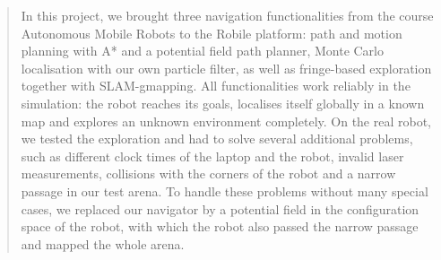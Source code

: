 \documentclass[../report.tex]{subfiles}
\begin{document}
    \begin{abstract}
        In this project, we brought three navigation functionalities from the course Autonomous Mobile Robots to the Robile platform: path and motion planning with A* and a potential field path planner, Monte Carlo localisation with our own particle filter, as well as fringe-based exploration together with SLAM-gmapping.
        All functionalities work reliably in the simulation: the robot reaches its goals, localises itself globally in a known map and explores an unknown environment completely.
        On the real robot, we tested the exploration and had to solve several additional problems, such as different clock times of the laptop and the robot, invalid laser measurements, collisions with the corners of the robot and a narrow passage in our test arena.
        To handle these problems without many special cases, we replaced our navigator by a potential field in the configuration space of the robot, with which the robot also passed the narrow passage and mapped the whole arena.
    \end{abstract}
\end{document}
